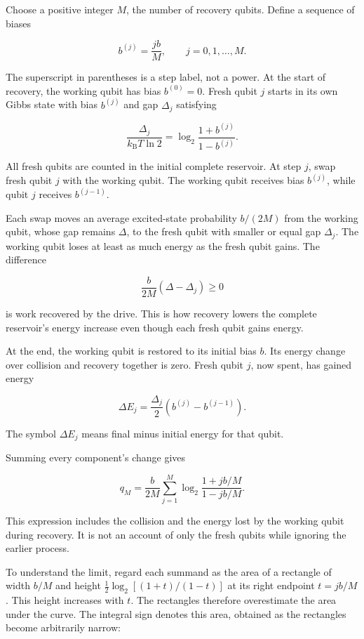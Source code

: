 \documentclass[11pt,letterpaper]{article}
\begin{document}
Choose a positive integer \(M\), the number of recovery qubits. Define a sequence of biases

\[b^{(j)} = \frac{jb}{M},\quad\quad j = 0,1,\ldots,M.\]

The superscript in parentheses is a step label, not a power. At the start of recovery, the working qubit has bias \(b^{(0)} = 0\). Fresh qubit \(j\) starts in its own Gibbs state with bias \(b^{(j)}\) and gap \(\Delta_{j}\) satisfying

\[\frac{\Delta_{j}}{k_{\mathrm{B}}T\ln 2} = \log_{2}\frac{1 + b^{(j)}}{1 - b^{(j)}}.\]

All fresh qubits are counted in the initial complete reservoir. At step \(j\), swap fresh qubit \(j\) with the working qubit. The working qubit receives bias \(b^{(j)}\), while qubit \(j\) receives \(b^{(j - 1)}\).

Each swap moves an average excited-state probability \(b/(2M)\) from the working qubit, whose gap remains \(\Delta\), to the fresh qubit with smaller or equal gap \(\Delta_{j}\). The working qubit loses at least as much energy as the fresh qubit gains. The difference

\[\frac{b}{2M}\left( \Delta - \Delta_{j} \right) \geq 0\]

is work recovered by the drive. This is how recovery lowers the complete reservoir's energy increase even though each fresh qubit gains energy.

At the end, the working qubit is restored to its initial bias \(b\). Its energy change over collision and recovery together is zero. Fresh qubit \(j\), now spent, has gained energy

\[\Delta E_{j} = \frac{\Delta_{j}}{2}\left( b^{(j)} - b^{(j - 1)} \right).\]

The symbol \(\Delta E_{j}\) means final minus initial energy for that qubit.

Summing every component's change gives

\[q_{M} = \frac{b}{2M}\sum_{j = 1}^{M}\log_{2}\frac{1 + jb/M}{1 - jb/M}.\]

This expression includes the collision and the energy lost by the working qubit during recovery. It is not an account of only the fresh qubits while ignoring the earlier process.

To understand the limit, regard each summand as the area of a rectangle of width \(b/M\) and height \(\tfrac{1}{2}\log_{2}\left\lbrack (1 + t)/(1 - t) \right\rbrack\) at its right endpoint \(t = jb/M\). This height increases with \(t\). The rectangles therefore overestimate the area under the curve. The integral sign denotes this area, obtained as the rectangles become arbitrarily narrow:
\end{document}
